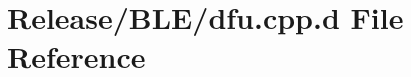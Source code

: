 \hypertarget{_release_2_b_l_e_2dfu_8cpp_8d}{\section{\-Release/\-B\-L\-E/dfu.cpp.\-d \-File \-Reference}
\label{_release_2_b_l_e_2dfu_8cpp_8d}
}

